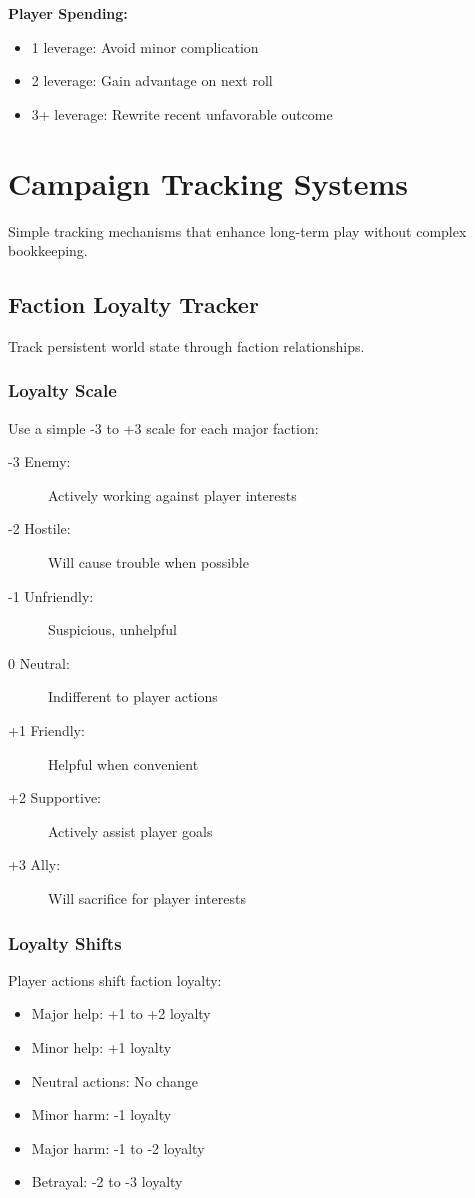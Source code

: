 \textbf{Player Spending:}
\begin{itemize}
\item 1 leverage: Avoid minor complication
\item 2 leverage: Gain advantage on next roll
\item 3+ leverage: Rewrite recent unfavorable outcome
\end{itemize}

\section{Campaign Tracking Systems}

Simple tracking mechanisms that enhance long-term play without complex bookkeeping.

\subsection{Faction Loyalty Tracker}

Track persistent world state through faction relationships.

\subsubsection{Loyalty Scale}

Use a simple -3 to +3 scale for each major faction:
\begin{description}
\item[-3 Enemy:] Actively working against player interests
\item[-2 Hostile:] Will cause trouble when possible
\item[-1 Unfriendly:] Suspicious, unhelpful
\item[0 Neutral:] Indifferent to player actions
\item[+1 Friendly:] Helpful when convenient
\item[+2 Supportive:] Actively assist player goals
\item[+3 Ally:] Will sacrifice for player interests
\end{description}

\subsubsection{Loyalty Shifts}

Player actions shift faction loyalty:
\begin{itemize}
\item Major help: +1 to +2 loyalty
\item Minor help: +1 loyalty
\item Neutral actions: No change
\item Minor harm: -1 loyalty
\item Major harm: -1 to -2 loyalty
\item Betrayal: -2 to -3 loyalty
\end{itemize}

